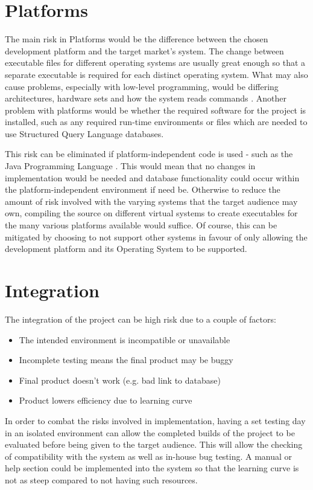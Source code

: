 \section{Platforms}
The main risk in Platforms would be the difference between the chosen
development platform and the target market's system.  The change between
executable files for different operating systems are usually great enough so
that a separate executable is required for each distinct operating system.
What may also cause problems, especially with low-level programming, would be
differing architectures, hardware sets and how the system reads commands
\cite{wikiArchDiff}.
Another problem with platforms would be whether the required software for the
project is installed, such as any required run-time environments or files
which are needed to use Structured Query Language databases.

This risk can be eliminated if platform-independent code is used - such as the
Java Programming Language \cite{javaFeatures}.  This would mean that no changes
in implementation would be needed and database functionality could occur within
the platform-independent environment if need be.  Otherwise to reduce the amount
of risk involved with the varying systems that the target audience may own,
compiling the source on different virtual systems to create executables for the
many various platforms available would suffice.  Of course, this can be
mitigated by choosing to not support other systems in favour of only allowing
the development platform and its Operating System to be supported.

\section{Integration}
The integration of the project can be high risk due to a couple of factors:

\begin{itemize}
    \item The intended environment is incompatible or unavailable
    \item Incomplete testing means the final product may be buggy
    \item Final product doesn't work (e.g. bad link to database)
    \item Product lowers efficiency due to learning curve \cite{RiskList}
\end{itemize}

In order to combat the risks involved in implementation, having a set testing
day in an isolated environment can allow the completed builds of the project to
be evaluated before being given to the target audience.  This will allow the
checking of compatibility with the system as well as in-house bug testing.  A
manual or help section could be implemented into the system so that the learning
curve is not as steep compared to not having such resources.

